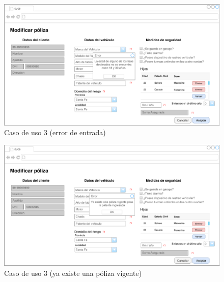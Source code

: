 \documentclass[12pt]{article}
\begin{document}
\vfill
\begin{figure}[h!]
\includegraphics[width=\textwidth]{CU3/CU-033.pdf}
\caption{Caso de uso 3 (error de entrada)}
\end{figure}
\vfill

\vfill
\begin{figure}[h!]
\includegraphics[width=\textwidth]{CU3/CU-034.pdf}
\caption{Caso de uso 3 (ya existe una póliza vigente)}
\end{figure}
\vfill



\end{document}
